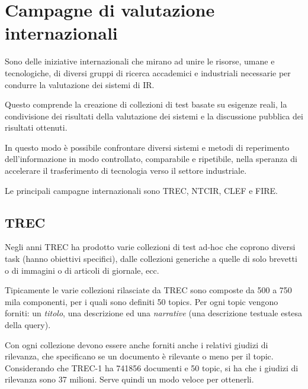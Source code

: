 

\section{Campagne di valutazione internazionali}

Sono delle iniziative internazionali che mirano ad unire le risorse, umane e tecnologiche, di diversi gruppi di ricerca accademici e industriali necessarie per condurre la valutazione dei sistemi di IR.

Questo comprende la creazione di collezioni di test basate su esigenze reali, la condivisione dei risultati della valutazione dei sistemi e la discussione pubblica dei risultati ottenuti.

In questo modo è possibile confrontare diversi sistemi e metodi di reperimento dell'informazione in modo controllato, comparabile e ripetibile, nella speranza di accelerare il trasferimento di tecnologia verso il settore industriale.

Le principali campagne internazionali sono TREC, NTCIR, CLEF e FIRE.

\subsection{TREC}

Negli anni TREC ha prodotto varie collezioni di test ad-hoc che coprono diversi task (hanno obiettivi specifici), dalle collezioni generiche a quelle di solo brevetti o di immagini o di articoli di giornale, ecc.

Tipicamente le varie collezioni rilasciate da TREC sono composte da 500 a 750 mila componenti, per i quali sono definiti 50 topics. Per ogni topic vengono forniti: un \textit{titolo}, una descrizione ed una \textit{narrative} (una descrizione testuale estesa della query).

Con ogni collezione devono essere anche forniti anche i relativi giudizi di rilevanza, che specificano se un documento è rilevante o meno per il topic.
Considerando che TREC-1 ha 741856 documenti e 50 topic, si ha che i giudizi di rilevanza sono 37 milioni. Serve quindi un modo veloce per ottenerli.

